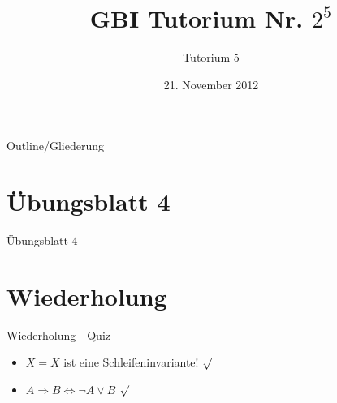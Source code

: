 

\title[Tutorium 5]{GBI Tutorium Nr. $2^5$}
\subtitle{Tutorium 5}
\date{21. November 2012}






	\begin{frame}
		\titlepage
	\end{frame}

	\begin{frame}{Outline/Gliederung}
		\tableofcontents
	\end{frame}
	
	
	\section{\"Ubungsblatt 4}
	\begin{frame} {Übungsblatt 4}
		
	\end{frame}	
		
	
	
	
	\section{Wiederholung} 
	\begin{frame} {Wiederholung - Quiz}
		\begin{itemize}
			\item $X=X$ ist eine Schleifeninvariante! 
			\only<2-> {\color{darkgreen}$\surd$}\\
			\color{black}
			
			\item $A \Rightarrow B \Leftrightarrow \neg A \lor B$
			\only<2-> {\color{darkgreen}$\surd$}\\
			\color{black}
		\end{itemize}
	\end{frame}
	
	
	
